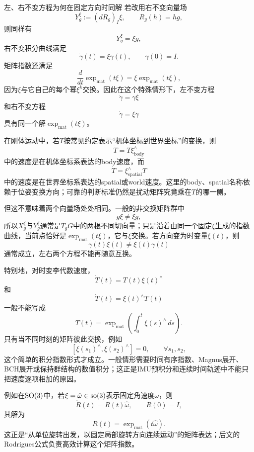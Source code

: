 \begin{lieexample}{左、右不变方程为何在固定方向时同解}
若改用右不变向量场
\[
    Y^\xi_g:=(dR_g)_I\xi,
    \qquad
    R_g(h)=hg,
\]
则同样有
\[
    Y^\xi_g=\xi g,
\]
右不变积分曲线满足
\[
    \dot\gamma(t)=\xi\gamma(t),
    \qquad
    \gamma(0)=I.
\]
矩阵指数还满足
\[
    \frac{d}{dt}\exp_{\mathrm{mat}}(t\xi)
    =\xi\exp_{\mathrm{mat}}(t\xi),
\]
因为$\xi$与它自己的每个幂$\xi^k$交换。因此在这个特殊情形下，左不变方程
\[
    \dot\gamma=\gamma\xi
\]
和右不变方程
\[
    \dot\gamma=\xi\gamma
\]
具有同一个解$\exp_{\mathrm{mat}}(t\xi)$。

在刚体运动中，若$T$按常见约定表示“机体坐标到世界坐标”的变换，则
\[
    \dot T=T\xi_{\mathrm{body}}^\wedge
\]
中的速度是在机体坐标系表达的body速度，而
\[
    \dot T=\xi_{\mathrm{spatial}}^\wedge T
\]
中的速度是在世界坐标系表达的spatial或world速度。这里的body、spatial名称依赖于位姿变换方向；可靠的判断标准仍然是扰动矩阵究竟乘在$T$的哪一侧。

但这不意味着两个向量场处处相同。一般的非交换矩阵群中
\[
    g\xi\neq\xi g,
\]
所以$X^\xi_g$与$Y^\xi_g$通常是$T_gG$中的两根不同切向量；只是沿着由同一个固定$\xi$生成的指数曲线，当前点恰好是$\exp_{\mathrm{mat}}(t\xi)$，它与$\xi$交换。若方向变为时变量$\xi(t)$，则
\[
    \gamma(t)\xi(t)\neq\xi(t)\gamma(t)
\]
通常成立，左右两个方程不能再随意互换。

特别地，对时变李代数速度，
\[
    \dot T(t)=T(t)\xi(t)^\wedge
\]
和
\[
    \dot T(t)=\xi(t)^\wedge T(t)
\]
一般不能写成
\[
    T(t)=\exp_{\mathrm{mat}}\left(\int_0^t\xi(s)^\wedge\,ds\right).
\]
只有当不同时刻的矩阵彼此交换，例如
\[
    [\xi(s_1)^\wedge,\xi(s_2)^\wedge]=0,
    \qquad\forall s_1,s_2,
\]
这个简单的积分指数形式才成立。一般情形需要时间有序指数、Magnus展开、BCH展开或保持群结构的数值积分；这正是IMU预积分和连续时间轨迹中不能只把速度逐项相加的原因。
\end{lieexample}

例如在$\operatorname{SO}(3)$中，若$\xi=\hat\omega\in\operatorname{so}(3)$表示固定角速度$\omega$，则
\[
    \dot R(t)=R(t)\hat\omega,
    \qquad
    R(0)=I,
\]
其解为
\[
    R(t)=\exp_{\mathrm{mat}}(t\hat\omega).
\]
这正是“从单位旋转出发，以固定局部旋转方向连续运动”的矩阵表达；后文的Rodrigues公式负责高效计算这个矩阵指数。

